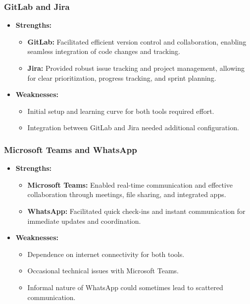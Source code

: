 \documentclass[11pt,a4paper]{article}
\begin{document}
    \subsubsection{GitLab and Jira}\label{subsubsec:gitlab-jira}
    \begin{itemize}
        \item \textbf{Strengths:}
        \begin{itemize}
            \item \textbf{GitLab:} Facilitated efficient version control and collaboration, enabling seamless integration of code changes and tracking.
            \item \textbf{Jira:} Provided robust issue tracking and project management, allowing for clear prioritization, progress tracking, and sprint planning.
        \end{itemize}
        \item \textbf{Weaknesses:}
        \begin{itemize}
            \item Initial setup and learning curve for both tools required effort.
            \item Integration between GitLab and Jira needed additional configuration.
        \end{itemize}
    \end{itemize}

    \subsubsection{Microsoft Teams and WhatsApp}\label{subsubsec:microsoft-teams-whatsapp}
    \begin{itemize}
        \item \textbf{Strengths:}
        \begin{itemize}
            \item \textbf{Microsoft Teams:} Enabled real-time communication and effective collaboration through meetings, file sharing, and integrated apps.
            \item \textbf{WhatsApp:} Facilitated quick check-ins and instant communication for immediate updates and coordination.
        \end{itemize}
        \item \textbf{Weaknesses:}
        \begin{itemize}
            \item Dependence on internet connectivity for both tools.
            \item Occasional technical issues with Microsoft Teams.
            \item Informal nature of WhatsApp could sometimes lead to scattered communication.
        \end{itemize}
    \end{itemize}
\end{document}
